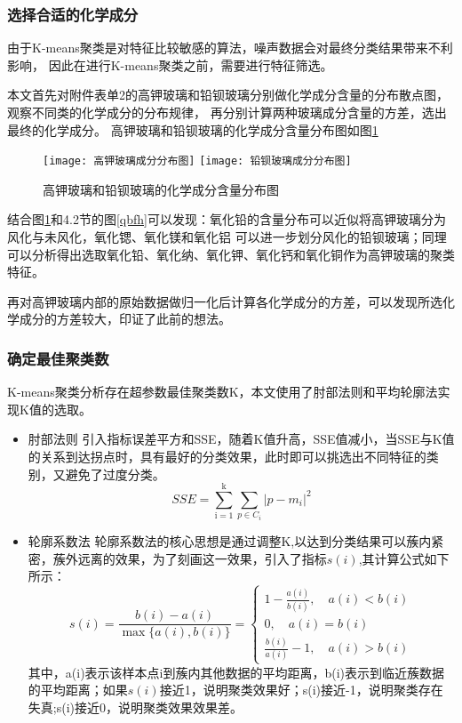 \documentclass[withoutpreface,bwprint]{cumcmthesis} %
\begin{document}
\subsubsection{选择合适的化学成分}

由于K-means聚类是对特征比较敏感的算法，噪声数据会对最终分类结果带来不利影响， 因此在进行K-means聚类之前，需要进行特征筛选。


本文首先对附件表单2的高钾玻璃和铅钡玻璃分别做化学成分含量的分布散点图，观察不同类的化学成分的分布规律， 再分别计算两种玻璃成分含量的方差，选出最终的化学成分。 高钾玻璃和铅钡玻璃的化学成分含量分布图如图\ref{qbhl}

\begin{figure}[!h]
	\centering
	\texttt{[image: 高钾玻璃成分分布图]}
	\texttt{[image: 铅钡玻璃成分分布图]}
	\caption{高钾玻璃和铅钡玻璃的化学成分含量分布图}
	\label{qbhl}
\end{figure}

结合图\ref{qbhl}和4.2节的图\ref{qbfh}可以发现：氧化铅的含量分布可以近似将高钾玻璃分为风化与未风化，氧化锶、氧化镁和氧化铝 可以进一步划分风化的铅钡玻璃；同理可以分析得出选取氧化铅、氧化纳、氧化钾、氧化钙和氧化铜作为高钾玻璃的聚类特征。


再对高钾玻璃内部的原始数据做归一化后计算各化学成分的方差，可以发现所选化学成分的方差较大，印证了此前的想法。

\subsubsection{确定最佳聚类数}

K-means聚类分析存在超参数最佳聚类数K，本文使用了肘部法则和平均轮廓法实现K值的选取。

\begin{itemize}
	\item 肘部法则 引入指标误差平方和SSE，随着K值升高，SSE值减小，当SSE与K值的关系到达拐点时，具有最好的分类效果，此时即可以挑选出不同特征的类别，又避免了过度分类。 $$SSE=\sum_{\mathrm{i}=1}^{\mathrm{k}} \sum_{p \in C_{i}}\left|p-m_{i}\right|^{2}$$
	\item 轮廓系数法 轮廓系数法的核心思想是通过调整K,以达到分类结果可以蔟内紧密，蔟外远离的效果，为了刻画这一效果，引入了指标$s(i)$,其计算公式如下所示： 
	\[
	s(i)=\frac{b(i)-a(i)}{\max \{a(i), b(i)\}}=\left\{\begin{array}{c}
		1-\frac{a(i)}{b(i)}, \quad a(i)<b(i) \\
		0, \quad a(i)=b(i) \\
		\frac{b(i)}{a(i)}-1, \quad a(i)>b(i)
	\end{array}\right.
	\]
	其中，a(i)表示该样本点i到蔟内其他数据的平均距离，b(i)表示到临近蔟数据的平均距离；如果$s(i)$接近1，说明聚类效果好；s(i)接近-1，说明聚类存在失真;s(i)接近0，说明聚类效果效果差。
\end{itemize}
\end{document}
